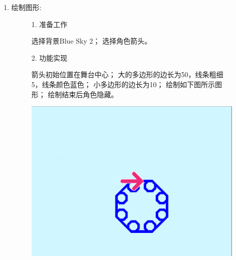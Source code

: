 \documentclass[10pt, a4paper]{article}
\begin{document}
\begin{enumerate}
        \item 绘制图形:
        \begin{figure}[htbp]
            \centering
            \begin{minipage}{.6\textwidth}
                1. 准备工作
                \begin{tasks}[label = (\arabic*)]
                    \task 选择背景Blue Sky 2；
                    \task 选择角色箭头。
                \end{tasks}
                2. 功能实现
                \begin{tasks}[label = (\arabic*)]
                    \task 箭头初始位置在舞台中心；
                    \task 大的多边形的边长为50，线条粗细5，线条颜色蓝色；
                    \task 小多边形的边长为10；
                    \task 绘制如下图所示图形；
                    \task 绘制结束后角色隐藏。 
                \end{tasks}
            \end{minipage}
            \begin{minipage}{.3\textwidth}
                \centering
                \includegraphics[width=\textwidth]{37.png}
            \end{minipage}
        \end{figure}
    \end{enumerate}
\end{document}
